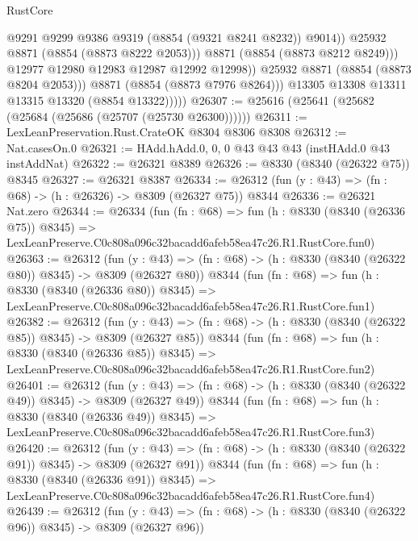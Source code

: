 \begin{lexlean}{RustCore}
\begin{coremodule}
                            @9291
                            @9299
                            @9386
                            @9319
                            (@8854 (@9321 @8241 @8232))
                            @9014))
                        @25932
                        @8871
                        (@8854 (@8873 @8222 @2053)))
                      @8871
                      (@8854 (@8873 @8212 @8249)))
                    @12977
                    @12980
                    @12983
                    @12987
                    @12992
                    @12998))
                @25932
                @8871
                (@8854 (@8873 @8204 @2053)))
              @8871
              (@8854 (@8873 @7976 @8264)))
            @13305
            @13308
            @13311
            @13315
            @13320
            (@8854 @13322)))))
@26307 := @25616 (@25641 (@25682 (@25684 (@25686 (@25707 (@25730 @26300))))))
@26311 := LexLeanPreservation.Rust.CrateOK @8304 @8306 @8308
@26312 := Nat.casesOn.{0}
@26321 := HAdd.hAdd.{0, 0, 0} @43 @43 @43 (instHAdd.{0} @43 instAddNat)
@26322 := @26321 @8389
@26326 := @8330 (@8340 (@26322 @75)) @8345
@26327 := @26321 @8387
@26334 := @26312 (fun (y : @43) => (fn : @68) -> (h : @26326) -> @8309 (@26327 @75)) @8344
@26336 := @26321 Nat.zero
@26344 := @26334
    (fun (fn : @68) =>
    fun (h : @8330 (@8340 (@26336 @75)) @8345) =>
    LexLeanPreserve.C0c808a096c32bacadd6afeb58ea47c26.R1.RustCore.fun0)
@26363 := @26312
    (fun (y : @43) => (fn : @68) -> (h : @8330 (@8340 (@26322 @80)) @8345) -> @8309 (@26327 @80))
    @8344
    (fun (fn : @68) =>
    fun (h : @8330 (@8340 (@26336 @80)) @8345) =>
    LexLeanPreserve.C0c808a096c32bacadd6afeb58ea47c26.R1.RustCore.fun1)
@26382 := @26312
    (fun (y : @43) => (fn : @68) -> (h : @8330 (@8340 (@26322 @85)) @8345) -> @8309 (@26327 @85))
    @8344
    (fun (fn : @68) =>
    fun (h : @8330 (@8340 (@26336 @85)) @8345) =>
    LexLeanPreserve.C0c808a096c32bacadd6afeb58ea47c26.R1.RustCore.fun2)
@26401 := @26312
    (fun (y : @43) => (fn : @68) -> (h : @8330 (@8340 (@26322 @49)) @8345) -> @8309 (@26327 @49))
    @8344
    (fun (fn : @68) =>
    fun (h : @8330 (@8340 (@26336 @49)) @8345) =>
    LexLeanPreserve.C0c808a096c32bacadd6afeb58ea47c26.R1.RustCore.fun3)
@26420 := @26312
    (fun (y : @43) => (fn : @68) -> (h : @8330 (@8340 (@26322 @91)) @8345) -> @8309 (@26327 @91))
    @8344
    (fun (fn : @68) =>
    fun (h : @8330 (@8340 (@26336 @91)) @8345) =>
    LexLeanPreserve.C0c808a096c32bacadd6afeb58ea47c26.R1.RustCore.fun4)
@26439 := @26312
    (fun (y : @43) => (fn : @68) -> (h : @8330 (@8340 (@26322 @96)) @8345) -> @8309 (@26327 @96))

\end{coremodule}
\end{lexlean}
